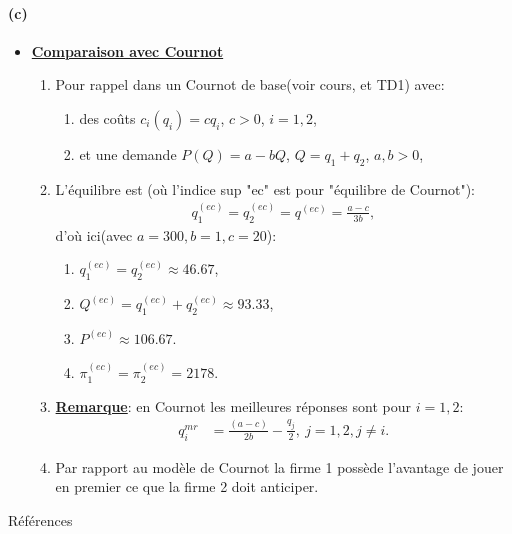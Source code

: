 \begin{frame}[allowframebreaks]{\insertsection}
\framesubtitle{(c)}
   \begin{itemize}
\item \underline{\textbf{Comparaison avec Cournot}}
 \begin{enumerate}[$\cdot$]
\item Pour rappel dans un Cournot de base(voir cours, et TD1) avec:
\begin{enumerate}[$\cdot$]
\item des coûts $c_i(q_i) = cq_i$, $c>0$, $i=1, 2$,
\item et une demande $P(Q) = a - bQ$, $Q=q_1+q_2$, $a, b > 0$,
\end{enumerate}
\item L'équilibre est (où l'indice sup "ec" est pour "équilibre de Cournot"):
\begin{align*}
    q_1^{(ec)} = q_2^{(ec)} = q^{(ec)} = \frac{a-c}{3b},
\end{align*}
d'où ici(avec $a=300, b=1, c=20$): 
\begin{enumerate}[-]
\item $q_1^{(ec)}=q_2^{(ec)}\approx 46.67$, 
\item $Q^{(ec)} = q_1^{(ec)}+q_2^{(ec)} \approx 93.33$,
\item $P^{(ec)} \approx 106.67$.
\item $\pi^{(ec)}_1 = \pi^{(ec)}_2 = 2178$.
\end{enumerate}

\item \textbf{\underline{Remarque}}: en Cournot les meilleures réponses sont pour $i=1, 2$:
\begin{align*}
    q_i^{mr}&=\frac{(a-c)}{2b} - \frac{q_j}{2}, \ j=1, 2, j\neq i.
\end{align*} 
\item Par rapport au modèle de Cournot la firme 1 possède l'avantage de jouer en premier ce que la firme 2 doit anticiper.
\end{enumerate}


\framebreak

\end{itemize}
\end{frame}
\begin{frame}[allowframebreaks]{Références}


\end{frame}


